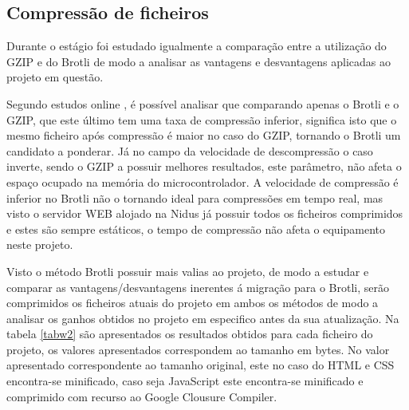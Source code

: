 \subsection{Compressão de ficheiros}\label{compress1}

\par Durante o estágio foi estudado igualmente a comparação entre a utilização do GZIP e do Brotli de modo a analisar as vantagens e desvantagens aplicadas ao projeto em questão.
\par Segundo estudos online \cite{brotlivsgzip}, é possível analisar que comparando apenas o Brotli e o GZIP, que este último tem uma taxa de compressão inferior, significa isto que o mesmo ficheiro após compressão é maior no caso do GZIP, tornando o Brotli um candidato a ponderar. Já no campo da velocidade de descompressão o caso inverte, sendo o GZIP a possuir melhores resultados, este parâmetro, não afeta o espaço ocupado na memória do microcontrolador. A velocidade de compressão é inferior no Brotli não o tornando ideal para compressões em tempo real, mas visto o servidor WEB alojado na Nidus já possuir todos os ficheiros comprimidos e estes são sempre estáticos, o tempo de compressão não afeta o equipamento neste projeto. 
\par Visto o método Brotli possuir mais valias ao projeto, de modo a estudar e comparar as vantagens/desvantagens inerentes á migração para o Brotli, serão comprimidos os ficheiros atuais do projeto em ambos os métodos de modo a analisar os ganhos obtidos no projeto em especifico antes da sua atualização. Na tabela \ref{tabw2} são apresentados os resultados obtidos para cada ficheiro do projeto, os valores apresentados correspondem ao tamanho em bytes. No valor apresentado correspondente ao tamanho original, este no caso do HTML e CSS encontra-se minificado, caso seja JavaScript este encontra-se minificado e comprimido com recurso ao Google Clousure Compiler.


